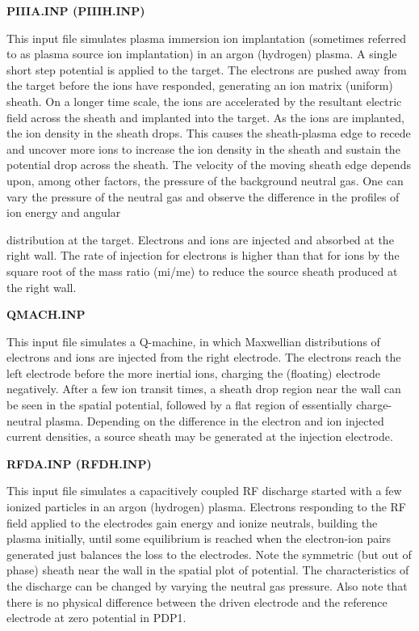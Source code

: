 \begin{section}
\begin{subsection}
\begin{subsubsection}
{\bf PIIIA.INP (PIIIH.INP)}

      This input file simulates plasma immersion ion implantation
(sometimes referred to as plasma source ion implantation) in an argon
(hydrogen) plasma.  A single short step potential is applied to the
target.  The electrons are pushed away from the target before the ions
have responded, generating an ion matrix (uniform) sheath.  On a
longer time scale, the ions are accelerated by the resultant electric
field across the sheath and implanted into the target.  As the ions
are implanted, the ion density in the sheath drops.  This causes the
sheath-plasma edge to recede and uncover more ions to increase the ion
density in the sheath and sustain the potential drop across the
sheath.  The velocity of the moving sheath edge depends upon, among
other factors, the pressure of the background neutral gas.  One can
vary the pressure of the neutral gas and observe the difference in the
profiles of ion energy and angular

      distribution at the target.  Electrons and ions are injected and
absorbed at the right wall.  The rate of injection for electrons is
higher than that for ions by the square root of the mass ratio (mi/me)
to reduce the source sheath produced at the right wall.
\end{subsubsection}

\begin{subsubsection}
{\bf QMACH.INP}

      This input file simulates a Q-machine, in which Maxwellian
distributions of electrons and ions are injected from the right
electrode.  The electrons reach the left electrode before the more
inertial ions, charging the (floating) electrode negatively.  After a
few ion transit times, a sheath drop region near the wall can be seen
in the spatial potential, followed by a flat region of essentially
charge-neutral plasma.  Depending on the difference in the electron
and ion injected current densities, a source sheath may be generated
at the injection electrode.
\end{subsubsection}

\begin{subsubsection}
{\bf RFDA.INP (RFDH.INP)}

      This input file simulates a capacitively coupled RF discharge
started with a few ionized particles in an argon (hydrogen) plasma.
Electrons responding to the RF field applied to the electrodes gain
energy and ionize neutrals, building the plasma initially, until some
equilibrium is reached when the electron-ion pairs generated just
balances the loss to the electrodes.  Note the symmetric (but out of
phase) sheath near the wall in the spatial plot of potential.  The
characteristics of the discharge can be changed by varying the neutral
gas pressure.  Also note that there is no physical difference between
the driven electrode and the reference electrode at zero potential in
PDP1.
\end{subsubsection}


\end{subsection}
\end{section}
